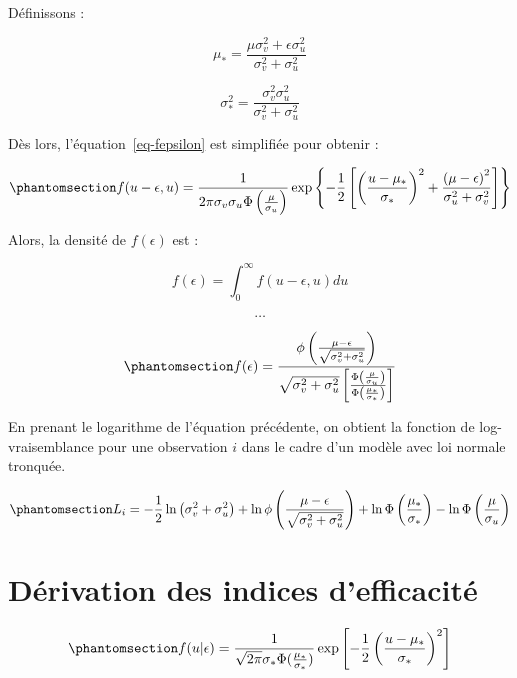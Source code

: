 \documentclass[
  12pt,
]{report}
\begin{document}
Définissons :

\[
\mu_* = \frac{\mu\sigma^2_v+\epsilon\sigma^2_u}{\sigma^2_v+\sigma^2_u}
\]

\[
\sigma^2_* = \frac{\sigma^2_v\sigma^2_u}{\sigma^2_v + \sigma^2_u}
\]

Dès lors, l'équation~\ref{eq-fepsilon} est simplifiée pour obtenir :

\begin{equation}\phantomsection\label{eq-fepsilon-3}{
f(u-\epsilon, u) = \frac{1}{2\pi\sigma_v\sigma_u\Phi\left(\frac{\mu}{\sigma_u}\right)}\exp\left\{-\frac{1}{2}\left[\left(\frac{u-\mu_*}{\sigma_*}\right)^2+\frac{\left(\mu - \epsilon\right)^2}{\sigma^2_u+\sigma^2_v}\right]\right\}
}\end{equation}

Alors, la densité de \(f(\epsilon)\) est :

\[
f(\epsilon) = \int_0^{\infty}f(u-\epsilon, u)du
\]

\[
\dots
\]

\begin{equation}\phantomsection\label{eq-fepsilon-4}{
f(\epsilon) = \frac{\phi\left(\frac{\mu - \epsilon}{\sqrt{\sigma^2_v+\sigma^2_u}}\right)}{\sqrt{\sigma^2_v+\sigma^2_u}\left[\frac{\Phi\left(\frac{\mu}{\sigma_u}\right)}{\Phi\left(\frac{\mu_*}{\sigma_*}\right)}\right]}
}\end{equation}

En prenant le logarithme de l'équation précédente, on obtient la
fonction de log-vraisemblance pour une observation \(i\) dans le cadre
d'un modèle avec loi normale tronquée.

\begin{equation}\phantomsection\label{eq-log-likelihood}{
L_i = - \frac{1}{2}\ln\left(\sigma^2_v+\sigma^2_u\right) + \ln \phi \left(\frac{\mu - \epsilon}{\sqrt{\sigma^2_v+\sigma^2_u}}\right) + \ln \Phi \left(\frac{\mu_*}{\sigma_*}\right) - \ln \Phi\left(\frac{\mu}{\sigma_u}\right)
}\end{equation}

\section{Dérivation des indices
d'efficacité}\label{duxe9rivation-des-indices-defficacituxe9}

\begin{equation}\phantomsection\label{eq-f-u-epsilon}{
f(u|\epsilon) = \frac{1}{\sqrt{2 \pi}\sigma_* \Phi(\frac{\mu_*}{\sigma_*})} \exp\left[- \frac{1}{2}\left(\frac{u - \mu_*}{\sigma_*}\right)^2\right]
}\end{equation}
\end{document}

